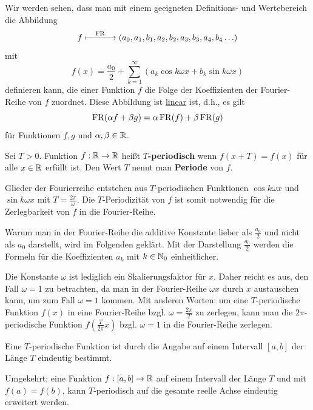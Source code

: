 \begin{bem}
		Wir werden sehen, dass man mit einem geeigneten Definitions- und Wertebereich die Abbildung 
		\[
				f  \xmapsto{\quad\operatorname{FR}\quad}  (a_0,a_1,b_1,a_2,b_2,a_3, b_3, a_4, b_4\ldots )
		\]
		mit
		\[
				f(x) = \frac{a_0}{2} + \sum_{k=1}^\infty (a_k \cos k \omega x + b_k \sin k \omega x)
		\]
		definieren kann, die einer Funktion $f$ die Folge der Koeffizienten der Fourier-Reihe von $f$ zuordnet. Diese Abbildung ist \underline{linear} ist, d.h., es gilt 
		\[
				\operatorname{FR}(\alpha f + \beta g) = \alpha \operatorname{FR}(f) + \beta \operatorname{FR}(g)
		\]
		für Funktionen $f,g$ und $\alpha,\beta \in \mathbb{R}$. 
\end{bem} 

\begin{defn}
	Sei $T>0$. 
	Funktion $f : \mathbb{R} \to \mathbb{R}$ heißt \textbf{$T$-periodisch} wenn $f(x+T)= f(x)$ für alle $x \in \mathbb{R}$ erfüllt ist. Den Wert $T$ nennt man \textbf{Periode} von $f$. 
\end{defn}

\begin{bem}
	Glieder der Fourierreihe entstehen aus $T$-periodischen Funktionen $\cos k \omega x$ und $\sin k \omega  x$  mit $T = \frac{2 \pi}{\omega}$.  Die $T$-Periodizität von $f$ ist somit notwendig für die Zerlegbarkeit von $f$ in die Fourier-Reihe. 
\end{bem} 


\begin{bem}
	Warum man in der Fourier-Reihe die additive Konstante lieber als $\frac{a_0}{2}$ und nicht als $a_0$ darstellt, wird im Folgenden geklärt. Mit der Darstellung $\frac{a_0}{2}$ werden die Formeln für die Koeffizienten $a_k$ mit $k \in \mathbb{N}_0$ einheitlicher. 
\end{bem} 


\begin{bem}
	Die Konstante $\omega$ ist lediglich ein Skalierungsfaktor für $x$. Daher reicht es aus, den Fall $\omega =1$ zu betrachten, da man in der Fourier-Reihe $\omega x$ durch $x$ austauschen kann, um zum Fall $\omega =1$ kommen. Mit anderen Worten: um eine $T$-periodische Funktion $f(x)$ in eine Fourier-Reihe bzgl. $\omega = \frac{2\pi}{T}$ zu zerlegen, kann man die $2\pi$-periodische Funktion $f ( \frac{T}{2 \pi} x)$ bzgl. $\omega=1$ in die Fourier-Reihe zerlegen. 
\end{bem}

\begin{bem} 
	Eine $T$-periodische Funktion ist durch die Angabe auf einem Intervall $[a,b]$ der Länge $T$ eindeutig bestimmt. 
	
	Umgekehrt: eine Funktion $f : [a,b] \to \mathbb{R}$ auf einem Intervall der Länge $T$ und mit $f(a)=f(b)$, kann $T$-periodisch auf die gesamte reelle Achse eindeutig erweitert werden. 
\end{bem} 

